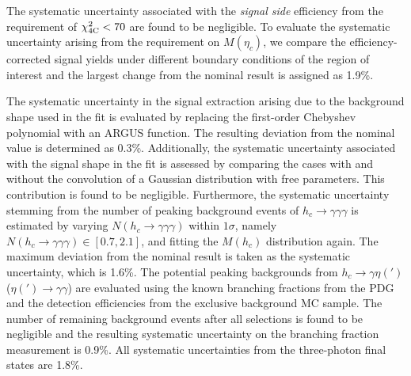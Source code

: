 \documentclass[twocolumn,showpacs,aps,prl]{revtex4-2}
\begin{document}
The systematic uncertainty associated with the \textit{signal side} efficiency from the requirement of $\chi^{2}_{\rm 4C}<70$ are found to be negligible. To evaluate the systematic uncertainty arising from the requirement on $M(\eta_c)$, we compare the efficiency-corrected signal yields under different boundary conditions of the region of interest and the largest change from the nominal result is assigned as 1.9\%.

The systematic uncertainty in the signal extraction arising due to the background shape used in the fit is evaluated by replacing the first-order Chebyshev polynomial with an ARGUS function. The resulting deviation from the nominal value is determined as 0.3\%. Additionally, the systematic uncertainty associated with the signal shape in the fit is assessed by comparing the cases with and without the convolution of a Gaussian distribution with free parameters. This contribution is found to be negligible. Furthermore, the systematic uncertainty stemming from the number of peaking background events of $h_{c} \to \gamma \gamma \gamma$ is estimated by varying $N(h_{c} \to \gamma \gamma \gamma)$ within $1\sigma$, namely $N(h_{c} \to \gamma \gamma \gamma) \in [0.7, 2.1]$, and fitting the $M(h_{c})$ distribution again. The maximum deviation from the nominal result is taken as the systematic uncertainty, which is 1.6\%. The potential peaking backgrounds from $h_c \to \gamma\eta(')$ ($\eta(')\to\gamma\gamma$) are evaluated using the known branching fractions from the PDG~\cite{ParticleDataGroup:2024cfk} and the detection efficiencies from the exclusive background MC sample. The number of remaining background events after all selections is found to be negligible and the resulting systematic uncertainty on the branching fraction measurement is 0.9\%. All systematic uncertainties from the three-photon final states are 1.8\%.
\end{document}
